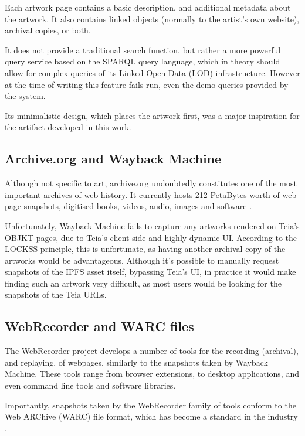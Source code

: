 Each artwork page contains a basic description, and additional metadata about the artwork. It also contains linked objects (normally to the artist's own website), archival copies, or both.

It does not provide a traditional search function, but rather a more powerful query service based on the SPARQL query language, which in theory should allow for complex queries of its Linked Open Data (LOD) infrastructure. However at the time of writing this feature fails run, even the demo queries provided by the system.

Its minimalistic design, which places the artwork first, was a major inspiration for the artifact developed in this work. 

\subsection{Archive.org and Wayback Machine}
\label{subsec:archiveorg}

Although not specific to art, archive.org undoubtedly constitutes one of the most important archives of web history. It currently hosts 212 PetaBytes worth of web page snapshots, digitised books, videos, audio, images and software \cite{InternetArchivePetabox}.

Unfortunately, Wayback Machine fails to capture any artworks rendered on Teia's OBJKT pages, due to Teia's client-side and highly dynamic UI. According to the LOCKSS principle, this is unfortunate, as having another archival copy of the artworks would be advantageous. Although it's possible to manually request snapshots of the IPFS asset itself, bypassing Teia's UI, in practice it would make finding such an artwork very difficult, as most users would be looking for the snapshots of the Teia URLs.

\subsection{WebRecorder and WARC files}

The WebRecorder project develops a number of tools for the recording (archival), and replaying, of webpages, similarly to the snapshots taken by Wayback Machine. These tools range from browser extensions, to desktop applications, and even command line tools and software libraries.

Importantly, snapshots taken by the WebRecorder family of tools conform to the Web ARChive (WARC) file format, which has become a standard in the industry \cite{WARCFileFormat2024}.


